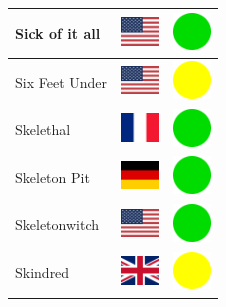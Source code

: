 \documentclass[12pt, a4paper, twoside]{report}
\begin{document}
\begin{center}
\begin{longtable}{|p{5cm}|p{2cm}|p{2cm}|}
Sick of it all & \includegraphics[width=1cm]{4x3/us} & \includegraphics[width=1cm]{likes/y} \\ \hline
Six Feet Under & \includegraphics[width=1cm]{4x3/us} & \includegraphics[width=1cm]{likes/m} \\ \hline
Skelethal & \includegraphics[width=1cm]{4x3/fr} & \includegraphics[width=1cm]{likes/y} \\ \hline
Skeleton Pit & \includegraphics[width=1cm]{4x3/de} & \includegraphics[width=1cm]{likes/y} \\ \hline
Skeletonwitch & \includegraphics[width=1cm]{4x3/us} & \includegraphics[width=1cm]{likes/y} \\ \hline
Skindred & \includegraphics[width=1cm]{4x3/gb} & \includegraphics[width=1cm]{likes/m} \\ \hline

\end{longtable}
\end{center}
\end{document}
